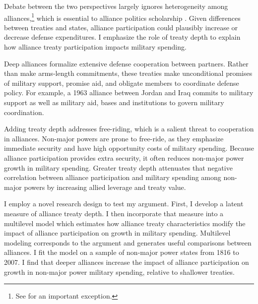 \documentclass[12pt]{article}
\begin{document}
Debate between the two perspectives largely ignores heterogeneity among alliances,\footnote{See \citet{DigiuseppePoast2016} for an important exception.} which is essential to alliance politics scholarship \citep{Morrow1991, Leeds2003, LeedsAnac2005, Fordham2010, Mattes2012, Benson2012, Poast2013, Johnsonetal2015}.  
Given differences between treaties and states, alliance participation could plausibly increase or decrease defense expenditures. 
I emphasize the role of treaty depth to explain how alliance treaty participation impacts military spending. 


Deep alliances formalize extensive defense cooperation between partners.
Rather than make arms-length commitments, these treaties make unconditional promises of military support, promise aid, and obligate members to coordinate defense policy. 
For example, a 1963 alliance between Jordan and Iraq commits to military support as well as military aid, bases and institutions to govern military coordination. 


Adding treaty depth addresses free-riding, which is a salient threat to cooperation in alliances. 
Non-major powers are prone to free-ride, as they emphasize immediate security and have high opportunity costs of military spending. 
Because alliance participation provides extra security, it often reduces non-major power growth in military spending. 
Greater treaty depth attenuates that negative correlation between alliance participation and military spending among non-major powers by increasing allied leverage and treaty value. 
 

I employ a novel research design to test my argument.
First, I develop a latent measure of alliance treaty depth. 
I then incorporate that measure into a multilevel model which estimates how alliance treaty characteristics modify the impact of alliance participation on growth in military spending.
Multilevel modeling corresponds to the argument and generates useful comparisons between alliances. 
I fit the model on a sample of non-major power states from 1816 to 2007. 
I find that deeper alliances increase the impact of alliance participation on growth in non-major power military spending, relative to shallower treaties.
\end{document}
